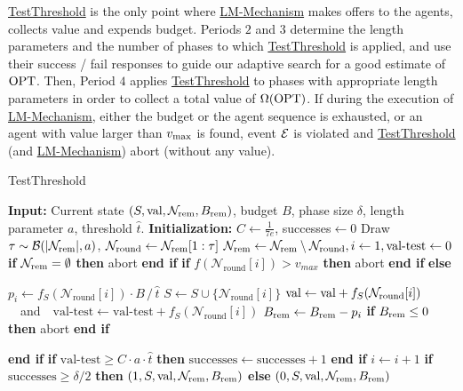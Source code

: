 \hyperref[alg:TestTHRESHOLD]{TestThreshold} is the only point where \hyperref[alg:LMMECH]{LM-Mechanism} makes offers to the agents, collects value and expends budget. Periods $2$ and $3$ determine the length parameters and the number of phases to which \hyperref[alg:TestTHRESHOLD]{TestThreshold} is applied, and use their success / fail responses to guide our adaptive search for a good estimate of $\mathrm{OPT}$. Then, Period $4$ applies \hyperref[alg:TestTHRESHOLD]{TestThreshold} to phases with appropriate length parameters in order to collect a total value of $\Omega(\mathrm{OPT})$. 
If during the execution of \hyperref[alg:LMMECH]{LM-Mechanism}, either the budget or the agent sequence is exhausted, or an agent with value larger than $v_{\text{max}}$ is found, event $\mathcal{E}$ is violated and \hyperref[alg:TestTHRESHOLD]{TestThreshold} (and \hyperref[alg:LMMECH]{LM-Mechanism}) abort (without  any value). 


\def\valest{\mathrm{val}\mbox{-}\mathrm{test}}
\begin{algorithm}[t]
  \caption{TestThreshold}\label{alg:TestTHRESHOLD}
 \begin{algorithmic}[1]
     \STATE \textbf{Input:} Current state $(S, \text{val}, \mathcal{N}_{\text{rem}}, B_{\text{rem}})$, budget $B$, phase size $\delta$, length parameter $a$, threshold $\hat{t}$.
     \STATE \textbf{Initialization:} $C \leftarrow \frac{1}{7e}$, successes$\gets 0$
    \STATE Draw $\tau \sim \mathcal{B}(|\mathcal{N}_{\text{rem}}|,a)$, $\mathcal{N}_{\text{round}} \leftarrow \mathcal{N}_{\text{rem}}[1 : \tau]$
    \STATE $\Nrem \leftarrow \Nrem \setminus \mathcal{N}_{\text{round}},i \leftarrow 1, \valest \leftarrow 0$
    \STATE \textbf{if} $\mathcal{N}_{\text{rem}} = \emptyset$ \textbf{then} abort \textbf{end if}
     \STATE \textbf{if} $f(\mathcal{N}_{\text{round}}[i]) > v_{max}$ \textbf{then} abort \textbf{end if}
    \STATE \textbf{else} 
    \begin{ALC@g}
    \STATE $p_i \leftarrow f_S(\mathcal{N}_{\text{round}}[i]) \cdot B\,/\, \hat{t} $\label{step:price}
    \STATE $S \gets S\cup \{\mathcal{N}_{\text{round}}[i]\}$
    \STATE $\text{val} \gets \text{val} + f_S(\mathcal{N}_{\text{round}}[i])$\ \  and\ \ $\valest \leftarrow \valest + f_S(\mathcal{N}_{\text{round}}[i])$
    \STATE $B_{\text{rem}} \leftarrow B_{\text{rem}} - p_i$ 
    \STATE \textbf{if} $B_{\text{rem}} \leq 0$ \textbf{then} abort \textbf{end if}
    \ENDIF
    \end{ALC@g}
    \STATE \textbf{end if}
    \STATE \textbf{if} $\valest \ge C \cdot a\cdot \hat{t}$ \textbf{then} $\text{successes} \gets \text{successes} +1$ \textbf{end if}\label{step:test}
    \STATE $i \gets i + 1$
    \ENDWHILE
    \ENDFOR
    \STATE \textbf{if} $\text{successes} \ge \delta /2$ \textbf{then} $(1, S, \text{val}, \mathcal{N}_{\text{rem}}, B_{\text{rem}})$ \textbf{else }$(0, S, \text{val}, \mathcal{N}_{\text{rem}}, B_{\text{rem}})$
 \end{algorithmic}
\end{algorithm}

